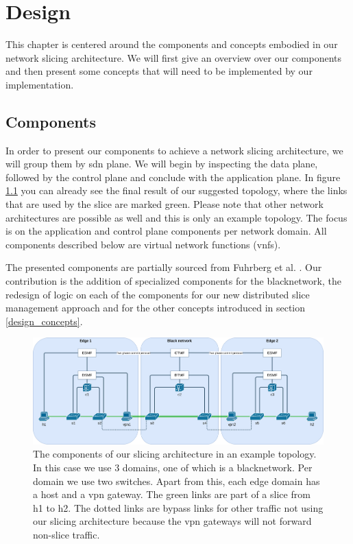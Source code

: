 \chapter{Design}
\label{design}

This chapter is centered around the components and concepts embodied in our network slicing architecture. We will first give an overview over our components and then present some concepts that will need to be implemented by our implementation.


\section{Components}
In order to present our components to achieve a network slicing architecture, we will group them by \acrshort{sdn} plane. We will begin by inspecting the data plane, followed by the control plane and conclude with the application plane. In figure \ref{fig:topology} you can already see the final result of our suggested topology, where the links that are used by the slice are marked green. Please note that other network architectures are possible as well and this is only an example topology. The focus is on the application and control plane components per network domain. All components described below are virtual network functions (\acrshort{vnf}s).

The presented components are partially sourced from Fuhrberg et al. \cite{SE4}. Our contribution is the addition of specialized components for the \gls{blacknetwork}, the redesign of logic on each of the components for our new distributed slice management approach and for the other concepts introduced in section \ref{design_concepts}.

\begin{landscape}
    \begin{figure}[ht]
        \centering
        \includegraphics[width=\linewidth]{images/chapter_5/topology.png}
        \caption[Slicing architecture components]{The components of our slicing architecture in an example topology. In this case we use 3 domains, one of which is a \gls{blacknetwork}. Per domain we use two switches. Apart from this, each edge domain has a host and a \acrshort{vpn} gateway. The green links are part of a slice from h1 to h2. The dotted links are bypass links for other traffic not using our slicing architecture because the \acrshort{vpn} gateways will not forward non-slice traffic.}
        \label{fig:topology}
    \end{figure}
\end{landscape}

